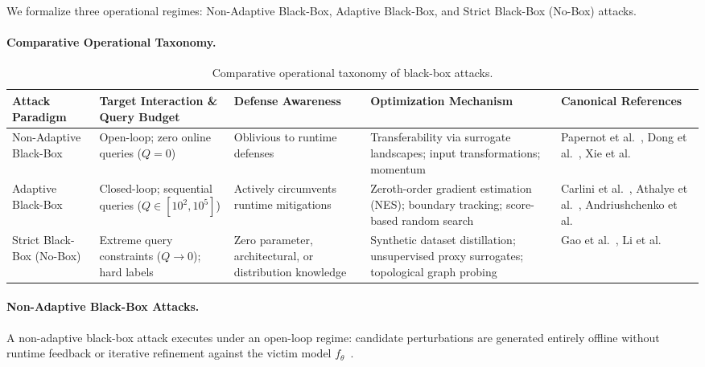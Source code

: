 \documentclass[12pt]{article}
\begin{document}
We formalize three operational regimes: Non-Adaptive Black-Box, Adaptive Black-Box, and Strict Black-Box (No-Box) attacks.

\paragraph{Comparative Operational Taxonomy.}

\begin{table}[htbp]
  \centering
  \normalsize
  \renewcommand{\arraystretch}{1.3}
  \begin{tabular}{@{}>{\raggedright\arraybackslash}p{}
                    >{\raggedright\arraybackslash}p{}
                    >{\raggedright\arraybackslash}p{}
                    >{\raggedright\arraybackslash}p{}
                    >{\raggedright\arraybackslash}p{}@{}}
    \toprule
    Attack Paradigm & Target Interaction \& Query Budget & Defense Awareness & Optimization Mechanism & Canonical References \\
    \midrule
    Non-Adaptive Black-Box & Open-loop; zero online queries ($Q = 0$) & Oblivious to runtime defenses & Transferability via surrogate landscapes; input transformations; momentum & Papernot et al.~\cite{papernot2017}, Dong et al.~\cite{dong2018}, Xie et al.~\cite{xie2019} \\
    Adaptive Black-Box & Closed-loop; sequential queries ($Q \in [10^2, 10^5]$) & Actively circumvents runtime mitigations & Zeroth-order gradient estimation (NES); boundary tracking; score-based random search & Carlini et al.~\cite{carlini2019}, Athalye et al.~\cite{athalye2018}, Andriushchenko et al.~\cite{andriushchenko2020} \\
    Strict Black-Box (No-Box) & Extreme query constraints ($Q \to 0$); hard labels & Zero parameter, architectural, or distribution knowledge & Synthetic dataset distillation; unsupervised proxy surrogates; topological graph probing & Gao et al.~\cite{gao2022}, Li et al.~\cite{li2020nobox} \\
    \bottomrule
  \end{tabular}
  \caption{Comparative operational taxonomy of black-box attacks.}
  \label{tab:blackbox}
\end{table}

\paragraph{Non-Adaptive Black-Box Attacks.} A non-adaptive black-box attack executes under an open-loop regime: candidate perturbations are generated entirely offline without runtime feedback or iterative refinement against the victim model $f_\theta$~\cite{papernot2017}.
\end{document}
